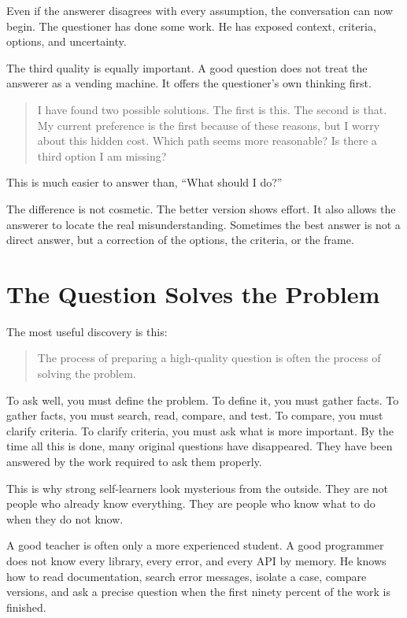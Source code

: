Even if the answerer disagrees with every assumption, the conversation can now begin. The questioner has done some work. He has exposed context, criteria, options, and uncertainty.

The third quality is equally important. A good question does not treat the answerer as a vending machine. It offers the questioner's own thinking first.

\begin{quote}
I have found two possible solutions. The first is this. The second is that. My current preference is the first because of these reasons, but I worry about this hidden cost. Which path seems more reasonable? Is there a third option I am missing?
\end{quote}

This is much easier to answer than, ``What should I do?''

The difference is not cosmetic. The better version shows effort. It also allows the answerer to locate the real misunderstanding. Sometimes the best answer is not a direct answer, but a correction of the options, the criteria, or the frame.

\section*{The Question Solves the Problem}

The most useful discovery is this:

\begin{quote}
The process of preparing a high-quality question is often the process of solving the problem.
\end{quote}

To ask well, you must define the problem. To define it, you must gather facts. To gather facts, you must search, read, compare, and test. To compare, you must clarify criteria. To clarify criteria, you must ask what is more important. By the time all this is done, many original questions have disappeared. They have been answered by the work required to ask them properly.

This is why strong self-learners look mysterious from the outside. They are not people who already know everything. They are people who know what to do when they do not know.

A good teacher is often only a more experienced student. A good programmer does not know every library, every error, and every API by memory. He knows how to read documentation, search error messages, isolate a case, compare versions, and ask a precise question when the first ninety percent of the work is finished.

